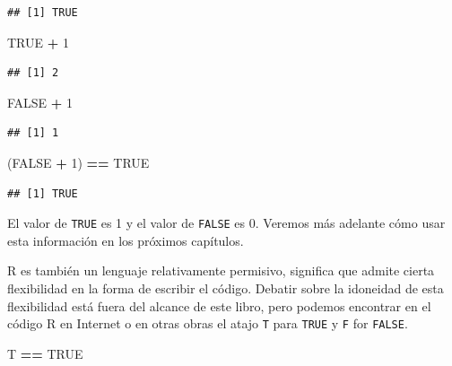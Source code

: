 \documentclass[]{book}
\newenvironment{Shaded}{\begin{snugshade}}{\end{snugshade}}
\newcommand{\DecValTok}[1]{\textcolor[rgb]{0.00,0.00,0.81}{#1}}
\newcommand{\StringTok}[1]{\textcolor[rgb]{0.31,0.60,0.02}{#1}}
\newcommand{\OtherTok}[1]{\textcolor[rgb]{0.56,0.35,0.01}{#1}}
\newcommand{\OperatorTok}[1]{\textcolor[rgb]{0.81,0.36,0.00}{\textbf{#1}}}
\newcommand{\NormalTok}[1]{#1}
\begin{document}
\begin{verbatim}
## [1] TRUE
\end{verbatim}

\begin{Shaded}
\begin{Highlighting}[]
\OtherTok{TRUE} \OperatorTok{+}\StringTok{ }\DecValTok{1}
\end{Highlighting}
\end{Shaded}

\begin{verbatim}
## [1] 2
\end{verbatim}

\begin{Shaded}
\begin{Highlighting}[]
\OtherTok{FALSE} \OperatorTok{+}\StringTok{ }\DecValTok{1}
\end{Highlighting}
\end{Shaded}

\begin{verbatim}
## [1] 1
\end{verbatim}

\begin{Shaded}
\begin{Highlighting}[]
\NormalTok{(}\OtherTok{FALSE} \OperatorTok{+}\StringTok{ }\DecValTok{1}\NormalTok{) }\OperatorTok{==}\StringTok{ }\OtherTok{TRUE}
\end{Highlighting}
\end{Shaded}

\begin{verbatim}
## [1] TRUE
\end{verbatim}

El valor de \texttt{TRUE} es 1 y el valor de \texttt{FALSE} es 0.
Veremos más adelante cómo usar esta información en los próximos
capítulos.

R es también un lenguaje relativamente permisivo, significa que admite
cierta flexibilidad en la forma de escribir el código. Debatir sobre la
idoneidad de esta flexibilidad está fuera del alcance de este libro,
pero podemos encontrar en el código R en Internet o en otras obras el
atajo \texttt{T} para \texttt{TRUE} y \texttt{F} for \texttt{FALSE}.

\begin{Shaded}
\begin{Highlighting}[]
\NormalTok{T }\OperatorTok{==}\StringTok{ }\OtherTok{TRUE}
\end{Highlighting}
\end{Shaded}
\end{document}
